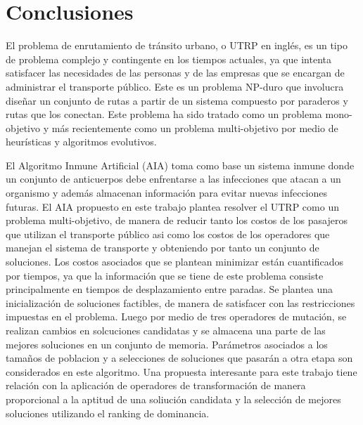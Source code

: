 \section{Conclusiones}

El problema de enrutamiento de tránsito urbano, o UTRP en inglés, es un tipo de problema complejo y contingente en los tiempos actuales, ya que intenta satisfacer las necesidades de las personas y de las empresas que se encargan de administrar el transporte público. Este es un problema NP-duro que involucra diseñar un conjunto de rutas a partir de un sistema compuesto por paraderos y rutas que los conectan. Este problema ha sido tratado como un problema mono-objetivo y más recientemente como un problema multi-objetivo por medio de heurísticas y algoritmos evolutivos.

El Algoritmo Inmune Artificial (AIA) toma como base un sistema inmune donde un conjunto de anticuerpos debe enfrentarse a las infecciones que atacan a un organismo y además almacenan información para evitar nuevas infecciones futuras. El AIA propuesto en este trabajo plantea resolver el UTRP como un problema multi-objetivo, de manera de reducir tanto los costos de los pasajeros que utilizan el transporte público asi como los costos de los operadores que manejan el sistema de transporte y obteniendo por tanto un conjunto de soluciones. Los costos asociados que se plantean minimizar están cuantificados por tiempos, ya que la información que se tiene de este problema consiste principalmente en tiempos de desplazamiento entre paradas. Se plantea una inicialización de soluciones factibles, de manera de satisfacer con las restricciones impuestas en el problema. Luego por medio de tres operadores de mutación, se realizan cambios en solcuciones candidatas y se almacena una parte de las mejores soluciones en un conjunto de memoria. Parámetros asociados a los tamaños de poblacion y a selecciones de soluciones que pasarán a otra etapa son considerados en este algoritmo. Una propuesta interesante para este trabajo tiene relación con la aplicación de operadores de transformación de manera proporcional a la aptitud de una soliución candidata y la selección de mejores soluciones utilizando el ranking de dominancia.

